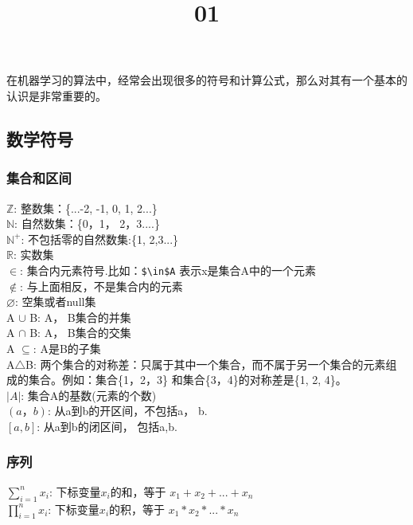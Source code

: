 \documentclass[11pt]{article}
\title{01}
\begin{document}
    
    
    \maketitle
    
    

    
    在机器学习的算法中，经常会出现很多的符号和计算公式，那么对其有一个基本的认识是非常重要的。

    \subsection{数学符号}\label{ux6570ux5b66ux7b26ux53f7}

    \subsubsection{集合和区间}\label{ux96c6ux5408ux548cux533aux95f4}

    \(\mathbb{Z}\): 整数集：\{...-2, -1, 0, 1, 2...\}\\
\(\mathbb{N}\): 自然数集：\{0，1， 2，3....\}\\
\(\mathbb{N}^{+}\): 不包括零的自然数集:\{1, 2,3...\}\\
\(\mathbb{R}\): 实数集\\
\(\in\): 集合内元素符号.比如：\texttt{\$\textbackslash{}in\$A}
表示x是集合A中的一个元素\\
\(\notin\): 与上面相反，不是集合内的元素\\
\(\varnothing\): 空集或者null集\\
A \(\cup\) B: A， B集合的并集\\
A \(\cap\) B: A， B集合的交集\\
A \(\subseteq\): A是B的子集\\
A\(\bigtriangleup\)B:
两个集合的对称差：只属于其中一个集合，而不属于另一个集合的元素组成的集合。例如：集合\{1，2，3\}
和集合\{3，4\}的对称差是\{1, 2, 4\}。\\
\(\left | A \right |\): 集合A的基数(元素的个数)\\
\(\left(a，b \right)\): 从a到b的开区间，不包括a， b.\\
\(\left [ a, b \right ]\): 从a到b的闭区间， 包括a,b.

    \subsubsection{序列}\label{ux5e8fux5217}

    \(\sum_{i=1}^{n}x_{i}\): 下标变量\(x_{i}\)的和，等于
\(x_{1} + x_{2} + ... + x_{n}\)\\
\(\prod_{i=1}^{n}x_{i}\): 下标变量\(x_{i}\)的积，等于
\(x_{1} * x_{2} * ... * x_{n}\)
\end{document}
